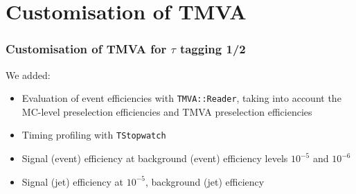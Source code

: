 \section{Customisation of TMVA}
\begin{frame}[fragile]
\frametitle{Customisation of TMVA for $\tau$ tagging 1/2}
\vspace{0.5cm}
We added:
\begin{itemize}
\item Evaluation of event efficiencies with {\tt TMVA::Reader}, taking into account
   the MC-level preselection efficiencies and TMVA preselection efficiencies

\item Timing profiling with {\tt TStopwatch}

\vspace{0.5cm}
\item Signal (event) efficiency at background (event) efficiency levels $10^{-5}$ and $10^{-6}$
\item Signal (jet) efficiency at $10^{-5}$,  background (jet) efficiency

\end{itemize}
\end{frame}


